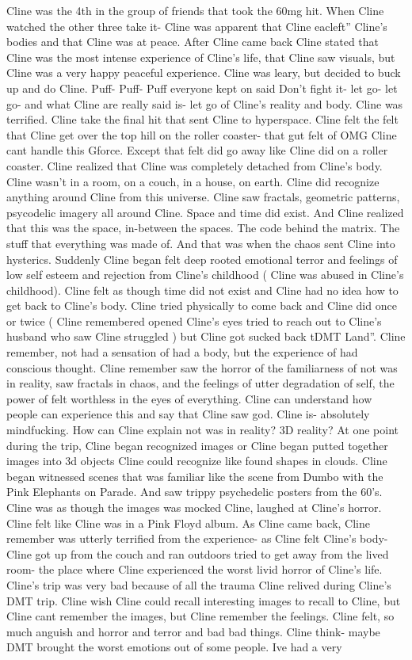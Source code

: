 \documentclass[12pt]{book}
\begin{document}
Cline was the 4th in the group of friends that took the 60mg hit. When Cline watched the other three take it- Cline was apparent that Cline eacleft'' Cline's bodies and that Cline was at peace. After Cline came back Cline stated that Cline was the most intense experience of Cline's life, that Cline saw visuals, but Cline was a very happy peaceful experience. Cline was leary, but decided to buck up and do Cline. Puff- Puff- Puff everyone kept on said Don't fight it- let go- let go- and what Cline are really said is- let go of Cline's reality and body. Cline was terrified. Cline take the final hit that sent Cline to hyperspace. Cline felt the felt that Cline get over the top hill on the roller coaster- that gut felt of OMG Cline cant handle this Gforce. Except that felt did go away like Cline did on a roller coaster. Cline realized that Cline was completely detached from Cline's body. Cline wasn't in a room, on a couch, in a house, on earth. Cline did recognize anything around Cline from this universe. Cline saw fractals, geometric patterns, psycodelic imagery all around Cline. Space and time did exist. And Cline realized that this was the space, in-between the spaces. The code behind the matrix. The stuff that everything was made of. And that was when the chaos sent Cline into hysterics. Suddenly Cline began felt deep rooted emotional terror and feelings of low self esteem and rejection from Cline's childhood (  Cline was abused in Cline's childhood). Cline felt as though time did not exist and Cline had no idea how to get back to Cline's body. Cline tried physically to come back and Cline did once or twice ( Cline remembered opened Cline's eyes tried to reach out to Cline's husband who saw Cline struggled ) but Cline got sucked back tDMT Land''. Cline remember, not had a sensation of had a body, but the experience of had conscious thought. Cline remember saw the horror of the familiarness of not was in reality, saw fractals in chaos, and the feelings of utter degradation of self, the power of felt worthless in the eyes of everything. Cline can understand how people can experience this and say that Cline saw god. Cline is- absolutely mindfucking. How can Cline explain not was in reality? 3D reality? At one point during the trip, Cline began recognized images or Cline began putted together images into 3d objects Cline could recognize like found shapes in clouds. Cline began witnessed scenes that was familiar like the scene from Dumbo with the Pink Elephants on Parade. And saw trippy psychedelic posters from the 60's. Cline was as though the images was mocked Cline, laughed at Cline's horror. Cline felt like Cline was in a Pink Floyd album. As Cline came back, Cline remember was utterly terrified from the experience- as Cline felt Cline's body- Cline got up from the couch and ran outdoors tried to get away from the lived room- the place where Cline experienced the worst livid horror of Cline's life. Cline's trip was very bad because of all the trauma Cline relived during Cline's DMT trip. Cline wish Cline could recall interesting images to recall to Cline, but Cline cant remember the images, but Cline remember the feelings. Cline felt, so much anguish and horror and terror and bad bad things. Cline think- maybe DMT brought the worst emotions out of some people. Ive had a very 
\end{document}
